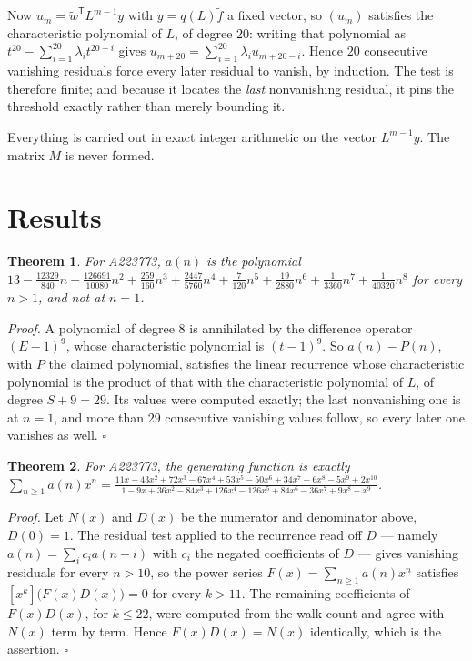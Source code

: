 \documentclass[11pt]{article}
\newtheorem{theorem}{Theorem}
\theoremstyle{definition}
\begin{document}
Now $u_m = \tilde w^{\mathsf T} L^{m-1} y$ with $y = q(L)\tilde f$ a fixed vector, so $(u_m)$ satisfies the characteristic polynomial of $L$, of degree $20$: writing that polynomial as $t^{20} - \sum_{i=1}^{20} \lambda_i t^{20-i}$ gives $u_{m+20} = \sum_{i=1}^{20} \lambda_i u_{m+20-i}$. Hence $20$ consecutive vanishing residuals force every later residual to vanish, by induction. The test is therefore finite; and because it locates the {\itshape last} nonvanishing residual, it pins the threshold exactly rather than merely bounding it.

Everything is carried out in exact integer arithmetic on the vector $L^{m-1}y$. The matrix $M$ is never formed.

\section{Results}

\begin{theorem} For A223773, $a(n)$ is the polynomial $13 - \frac{12329}{840}n + \frac{126691}{10080}n^{2} + \frac{259}{160}n^{3} + \frac{2447}{5760}n^{4} + \frac{7}{120}n^{5} + \frac{19}{2880}n^{6} + \frac{1}{3360}n^{7} + \frac{1}{40320}n^{8}$ for every $n > 1$, and not at $n = 1$.\end{theorem}

{\itshape Proof.} A polynomial of degree $8$ is annihilated by the difference operator $(E-1)^{9}$, whose characteristic polynomial is $(t-1)^{9}$. So $a(n) - P(n)$, with $P$ the claimed polynomial, satisfies the linear recurrence whose characteristic polynomial is the product of that with the characteristic polynomial of $L$, of degree $S + 9 = 29$. Its values were computed exactly; the last nonvanishing one is at $n = 1$, and more than $29$ consecutive vanishing values follow, so every later one vanishes as well. $\square$

\begin{theorem} For A223773, the generating function is exactly $\sum_{n\ge 1} a(n)x^n = \frac{11x - 43x^{2} + 72x^{3} - 67x^{4} + 53x^{5} - 50x^{6} + 34x^{7} - 6x^{8} - 5x^{9} + 2x^{10}}{1 - 9x + 36x^{2} - 84x^{3} + 126x^{4} - 126x^{5} + 84x^{6} - 36x^{7} + 9x^{8} - x^{9}}$.\end{theorem}

{\itshape Proof.} Let $N(x)$ and $D(x)$ be the numerator and denominator above, $D(0)=1$. The residual test applied to the recurrence read off $D$ --- namely $a(n) = \sum_i c_i a(n-i)$ with $c_i$ the negated coefficients of $D$ --- gives vanishing residuals for every $n > 10$, so the power series $F(x)=\sum_{n\ge 1}a(n)x^n$ satisfies $[x^k]\bigl(F(x)D(x)\bigr) = 0$ for every $k > 11$. The remaining coefficients of $F(x)D(x)$, for $k \le 22$, were computed from the walk count and agree with $N(x)$ term by term. Hence $F(x)D(x) = N(x)$ identically, which is the assertion. $\square$
\end{document}
